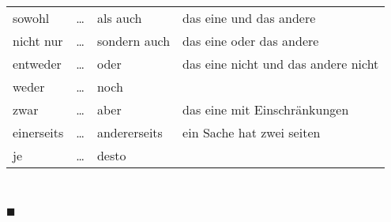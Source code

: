 \documentclass[a4paper,twocolumn,10pt]{article}
\newcommand{\sectionend}
{
\nolinenumbers
\begin{center}
	$\blacksquare$
\end{center}
\clearpage
\linenumbers
}
\newcommand{\subsectionend}
{
\nolinenumbers
\linenumbers
}
\newcommand{\tabularxtable}[3]
{

	\vspace{0.5cm}
	\nolinenumbers

	\begin{tabularx}{#1}{#2}
		#3
	\end{tabularx}

	\linenumbers
	\vspace{0.5cm}
}
\begin{document}

\tabularxtable
{0.95\linewidth}
{lllX}
{
sowohl     & \ldots & als auch     & das eine und das andere \\
nicht nur  & \ldots & sondern auch & das eine oder das andere \\
entweder   & \ldots & oder         & das eine nicht und das andere nicht\\
weder      & \ldots & noch         & \\
zwar       & \ldots & aber         & das eine mit Einschränkungen\\
einerseits & \ldots & andererseits & ein Sache hat zwei seiten\\
je & \ldots & desto & \\



}~\cite{netzwerk_b1}



\subsectionend




\sectionend



\onecolumn
\nolinenumbers




\end{document}
